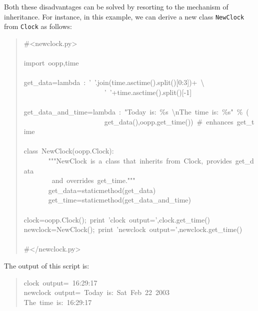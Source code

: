 \documentclass[10pt,english]{article}
\begin{document}
Both these disadvantages can be solved by resorting to the mechanism of
inheritance. For instance, in this example, we can derive a new class 
\texttt{NewClock} from \texttt{Clock} as follows:
\begin{quote}
\begin{ttfamily}\begin{flushleft}
\mbox{{\#}<newclock.py>}\\
\mbox{}\\
\mbox{import~oopp,time}\\
\mbox{}\\
\mbox{get{\_}data=lambda~:~'~'.join(time.asctime().split()[0:3])+~{\textbackslash}}\\
\mbox{~~~~~~~~~~~~~~~~~~~~~~~'~'+time.asctime().split()[-1]}\\
\mbox{}\\
\mbox{get{\_}data{\_}and{\_}time=lambda~:~"Today~is:~{\%}s~{\textbackslash}nThe~time~is:~{\%}s"~{\%}~(}\\
\mbox{~~~~~~~~~~~~~~~~~~~~~~~get{\_}data(),oopp.get{\_}time())~{\#}~enhances~get{\_}time}\\
\mbox{}\\
\mbox{class~NewClock(oopp.Clock):}\\
\mbox{~~~~~~~"""NewClock~is~a~class~that~inherits~from~Clock,~provides~get{\_}data}\\
\mbox{~~~~~~~~and~overrides~get{\_}time."""}\\
\mbox{~~~~~~~get{\_}data=staticmethod(get{\_}data)}\\
\mbox{~~~~~~~get{\_}time=staticmethod(get{\_}data{\_}and{\_}time)}\\
\mbox{}\\
\mbox{clock=oopp.Clock();~print~'clock~output=',clock.get{\_}time()~}\\
\mbox{newclock=NewClock();~print~'newclock~output=',newclock.get{\_}time()}\\
\mbox{}\\
\mbox{{\#}</newclock.py>}
\end{flushleft}\end{ttfamily}
\end{quote}

The output of this script is:
\begin{quote}
\begin{ttfamily}\begin{flushleft}
\mbox{clock~output=~16:29:17}\\
\mbox{newclock~output=~Today~is:~Sat~Feb~22~2003~}\\
\mbox{The~time~is:~16:29:17}
\end{flushleft}\end{ttfamily}
\end{quote}
\end{document}
